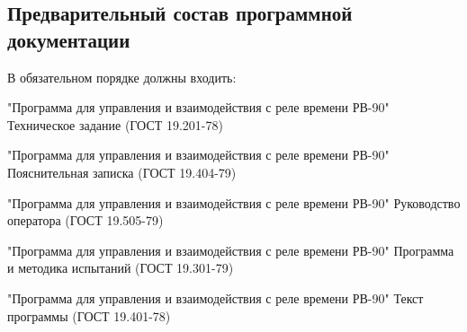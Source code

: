 \subsection{Предварительный состав программной документации}
В обязательном порядке должны входить:
\begin{my_enumerate}
\item "Программа для управления и взаимодействия с реле времени РВ-90" Техническое задание  (ГОСТ 19.201-78)
\item "Программа для управления и взаимодействия с реле времени РВ-90" Пояснительная записка  (ГОСТ 19.404-79)
\item "Программа для управления и взаимодействия с реле времени РВ-90" Руководство оператора  (ГОСТ 19.505-79)
\item "Программа для управления и взаимодействия с реле времени РВ-90" Программа и методика испытаний (ГОСТ 19.301-79)
\item "Программа для управления и взаимодействия с реле времени РВ-90" Текст программы  (ГОСТ 19.401-78)
\end{my_enumerate}

